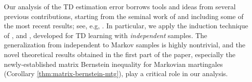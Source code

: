 
Our analysis of the TD estimation error borrows tools and ideas from several previous contributions, starting from the seminal work of \cite{polyak1992acceleration} and including some of the most recent results; see, e.g, \cite{li2023online,samsonov2024gaussian,srikant2024rates}. In particular, we apply the induction technique of \cite{srikant2019finite}, \cite{li2023sharp} and \cite{wu2024statistical}, developed for TD learning with \emph{independent} samples. The generalization from independent to Markov samples is highly nontrivial, and the novel theoretical results obtained in the first part of the paper, especially the newly-established matrix Bernstein inequality for Markovian martingales (Corollary \ref{thm:matrix-bernstein-mtg}), play a critical role in our analysis.

